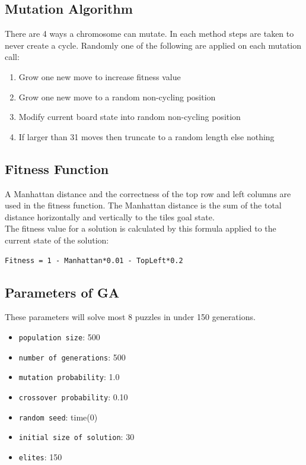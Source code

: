 \documentclass[]{article}
\begin{document}
\subsection{Mutation Algorithm}\label{mutation-algorithm}

There are 4 ways a chromosome can mutate. In each method steps are taken
to never create a cycle. Randomly one of the following are applied on
each mutation call:

\begin{enumerate}
\itemsep1pt\parskip0pt
\item
  Grow one new move to increase fitness value
\item
  Grow one new move to a random non-cycling position
\item
  Modify current board state into random non-cycling position
\item
  If larger than 31 moves then truncate to a random length else nothing
\end{enumerate}

\subsection{Fitness Function}\label{fitness-function}

A Manhattan distance and the correctness of the top row and left columns
are used in the fitness function. The Manhattan distance is the sum of
the total distance horizontally and vertically to the tiles goal
state.\\The fitness value for a solution is calculated by this formula
applied to the current state of the solution:

\begin{verbatim}
Fitness = 1 - Manhattan*0.01 - TopLeft*0.2
\end{verbatim}

\subsection{Parameters of GA}\label{parameters-of-ga}

These parameters will solve most 8 puzzles in under 150 generations.

\begin{itemize}
\itemsep1pt\parskip0pt
\item
  \texttt{population size}: 500
\item
  \texttt{number of generations}: 500
\item
  \texttt{mutation probability}: 1.0
\item
  \texttt{crossover probability}: 0.10
\item
  \texttt{random seed}: time(0)
\item
  \texttt{initial size of solution}: 30
\item
  \texttt{elites}: 150
\end{itemize}
\end{document}
